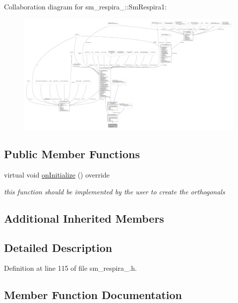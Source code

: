 Collaboration diagram for sm\+\_\+respira\+\_\+:\+:Sm\+Respira1\+:
\nopagebreak
\begin{figure}[H]
\begin{center}
\leavevmode
\includegraphics[width=350pt]{structsm__respira__1_1_1SmRespira1__coll__graph}
\end{center}
\end{figure}
\subsection*{Public Member Functions}
\begin{DoxyCompactItemize}
\item 
virtual void \hyperlink{structsm__respira__1_1_1SmRespira1_a6be26eb018ef73a2e39772fe4a03e551}{on\+Initialize} () override
\begin{DoxyCompactList}\small\item\em this function should be implemented by the user to create the orthogonals \end{DoxyCompactList}\end{DoxyCompactItemize}
\subsection*{Additional Inherited Members}


\subsection{Detailed Description}


Definition at line 115 of file sm\+\_\+respira\+\_.\+h.



\subsection{Member Function Documentation}
\mbox{\label{structsm__respira__1_1_1SmRespira1_a6be26eb018ef73a2e39772fe4a03e551}} 
